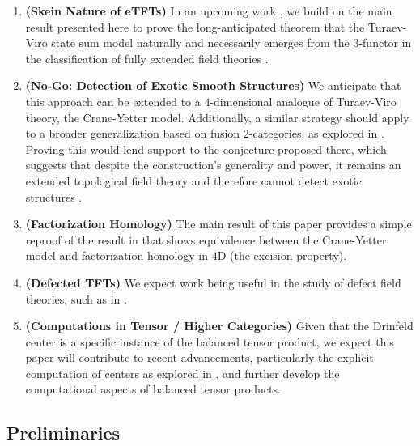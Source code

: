 \begin{enumerate}
  \item \textbf{(Skein Nature of eTFTs)} In an upcoming work
        \cite{guu/tv-as-3-functor}, we build on the main result presented here
        to prove the long-anticipated theorem that the Turaev-Viro state sum
        model \cite{viro/turaev-viro-model} naturally and necessarily emerges
        from the 3-functor in the classification of fully extended field
        theories \cite{lurie/tqft} \cite{douglas/dualizable-tensor-categories}.
  \item \textbf{(No-Go: Detection of Exotic Smooth Structures)} We anticipate
        that this approach can be extended to a $4$-dimensional analogue of
        Turaev-Viro theory, the Crane-Yetter model. Additionally, a similar
        strategy should apply to a broader generalization based on fusion
        2-categories, as explored in \cite{douglas/fusion-2-cat-4d-tqft}.
        Proving this would lend support to the conjecture proposed there,
        which suggests that despite the construction's generality and power,
        it remains an extended topological field theory and therefore cannot
        detect exotic structures \cite{reutter/no-go-exotic}.
  \item \textbf{(Factorization Homology)} The main result of this paper
        provides a simple reproof of the result in
        \cite{kirillov/fact-homo-4d-tqft} that shows equivalence between the
        Crane-Yetter model and factorization homology
        \cite{ayala/factorization-homology} in $4$D (the excision property).
  \item \textbf{(Defected TFTs)} We expect work being useful in the study of
        defect field theories, such as in \cite{meusburger/defect-tv}.
  \item \textbf{(Computations in Tensor / Higher Categories)} Given that the
        Drinfeld center is a specific instance of the balanced tensor product,
        we expect this paper will contribute to recent advancements,
        particularly the explicit computation of centers as explored in
        \cite{maurer/computing-center}, and further develop the computational
        aspects of balanced tensor products.
\end{enumerate}



\subsection{Preliminaries}\label{subsection/preliminaries}

